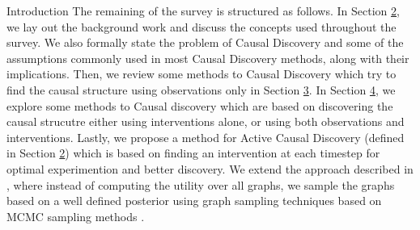 \documentclass[10pt]{article}
\begin{document}
\begin{psection}{Introduction}
    The remaining of the survey is structured as follows. In Section
    \hyperlink{sec:2}{2}, we lay out the background work and discuss the concepts used
    throughout the survey.  We also formally state the problem of Causal Discovery and
    some of the assumptions commonly used in most Causal Discovery methods, along with
    their implications. Then, we review some methods to Causal Discovery which try to
    find the causal structure using observations only in Section \hyperlink{sec:3}{3}.
    In Section \hyperlink{sec:4}{4}, we explore some methods to Causal discovery which
    are based on discovering the causal strucutre either using interventions alone, or
    using both observations and interventions. Lastly, we propose a method for Active
    Causal Discovery (defined in Section \hyperlink{sec:2}{2}) which is based on finding
    an intervention at each timestep for optimal experimention and better discovery. We
    extend the approach described in \citep{kgelgen2019optimal}, where instead of
    computing the utility over all graphs, we sample the graphs based on a well defined
    posterior using graph sampling techniques based on MCMC sampling methods
    \citep{agrawal2018minimal}.

\end{psection}
\end{document}

